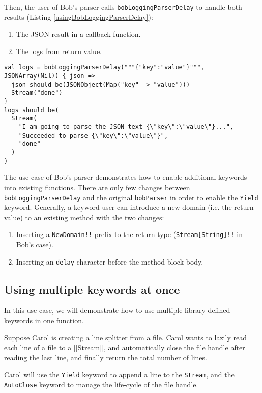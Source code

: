 Then, the user of Bob's parser calls \lstinline{bobLoggingParserDelay} to handle both results (Listing \ref{usingBobLoggingParserDelay}):

\begin{enumerate}
  \item The JSON result in a callback function.
  \item The logs from return value.
\end{enumerate}

\begin{lstlisting}[caption={Using Bob's parser},label={usingBobLoggingParserDelay}]
val logs = bobLoggingParserDelay("""{"key":"value"}""", JSONArray(Nil)) { json =>
  json should be(JSONObject(Map("key" -> "value")))
  Stream("done")
}
logs should be(
  Stream(
    "I am going to parse the JSON text {\"key\":\"value\"}...",
    "Succeeded to parse {\"key\":\"value\"}",
    "done"
  )
)
\end{lstlisting}

The use case of Bob's parser demonstrates how to enable additional keywords into existing functions. There are only few changes between \lstinline{bobLoggingParserDelay} and the original \lstinline{bobParser} in order to enable the \lstinline{Yield} keyword. Generally, a keyword user can introduce a new domain (i.e. the return value) to an existing method with the two changes:

\begin{enumerate}
  \item Inserting a \lstinline{NewDomain!!} prefix to the return type (\lstinline{Stream[String]!!} in Bob's case).
  \item Inserting an \lstinline{delay} character before the method block body.
\end{enumerate}

\subsection{Using multiple keywords at once}
\label{Using multiple keywords at once}

In this use case, we will demonstrate how to use multiple library-defined keywords in one function.

Suppose Carol is creating a line splitter from a file. Carol wants to lazily read each line of a file to a [[Stream]], and automatically close the file handle after reading the last line, and finally return the total number of lines.

Carol will use the \lstinline{Yield} keyword to append a line to the \lstinline{Stream}, and the \lstinline{AutoClose} keyword to manage the life-cycle of the file handle.

